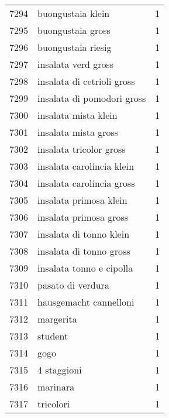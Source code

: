 \begin{tabular}{llr}
7294 &                                  buongustaia klein &      1 \\
7295 &                                  buongustaia gross &      1 \\
7296 &                                 buongustaia riesig &      1 \\
7297 &                                insalata verd gross &      1 \\
7298 &                         insalata di cetrioli gross &      1 \\
7299 &                         insalata di pomodori gross &      1 \\
7300 &                               insalata mista klein &      1 \\
7301 &                               insalata mista gross &      1 \\
7302 &                            insalata tricolor gross &      1 \\
7303 &                          insalata carolincia klein &      1 \\
7304 &                          insalata carolincia gross &      1 \\
7305 &                             insalata primosa klein &      1 \\
7306 &                             insalata primosa gross &      1 \\
7307 &                            insalata di tonno klein &      1 \\
7308 &                            insalata di tonno gross &      1 \\
7309 &                           insalata tonno e cipolla &      1 \\
7310 &                                  pasato di verdura &      1 \\
7311 &                             hausgemacht cannelloni &      1 \\
7312 &                                          margerita &      1 \\
7313 &                                            student &      1 \\
7314 &                                               gogo &      1 \\
7315 &                                        4 staggioni &      1 \\
7316 &                                           marinara &      1 \\
7317 &                                          tricolori &      1 \\

\end{tabular}
